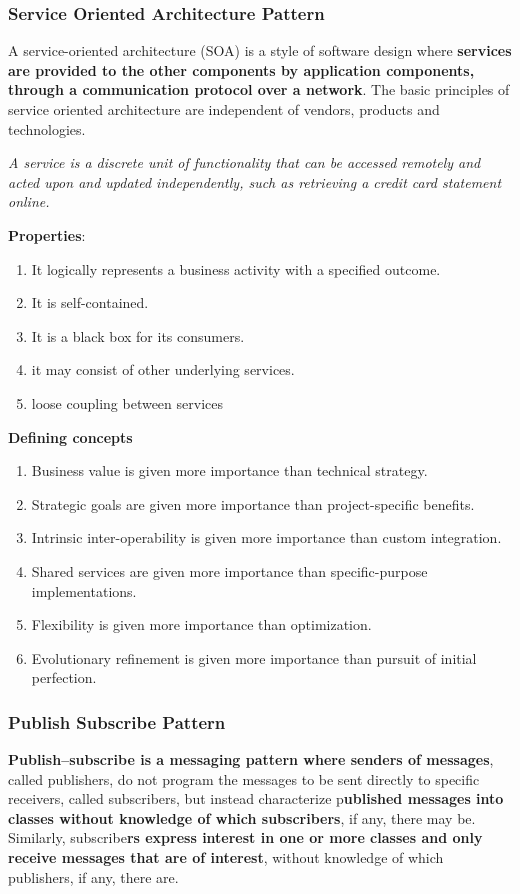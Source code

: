 \documentclass[a4paper]{article}
\begin{document}
\subsubsection{Service Oriented Architecture Pattern}
A service-oriented architecture (SOA) is a style of software design where \textbf{services are provided to the other components by application components, through a communication protocol over a network}. The basic principles of service oriented architecture are independent of vendors, products and technologies. 

\textit{A service is a discrete unit of functionality that can be accessed remotely and acted upon and updated independently, such as retrieving a credit card statement online.
}


\textbf{Properties}:
\begin{enumerate}
\item It logically represents a business activity with a specified outcome.
\item It is self-contained.
\item It is a black box for its consumers.
\item it may consist of other underlying services.
\item loose coupling between services
\end{enumerate}

\textbf{Defining concepts}
\begin{enumerate}
\item Business value is given more importance than technical strategy.
\item Strategic goals are given more importance than project-specific benefits.
\item Intrinsic inter-operability is given more importance than custom integration.
\item Shared services are given more importance than specific-purpose implementations.
\item Flexibility is given more importance than optimization.
\item Evolutionary refinement is given more importance than pursuit of initial perfection.
\end{enumerate}

\subsubsection{Publish Subscribe Pattern}
\textbf{Publish–subscribe is a messaging pattern where senders of messages}, called publishers, do not program the messages to be sent directly to specific receivers, called subscribers, but instead characterize p\textbf{ublished messages into classes without knowledge of which subscribers}, if any, there may be. Similarly, subscribe\textbf{rs express interest in one or more classes and only receive messages that are of interest}, without knowledge of which publishers, if any, there are.
\end{document}
